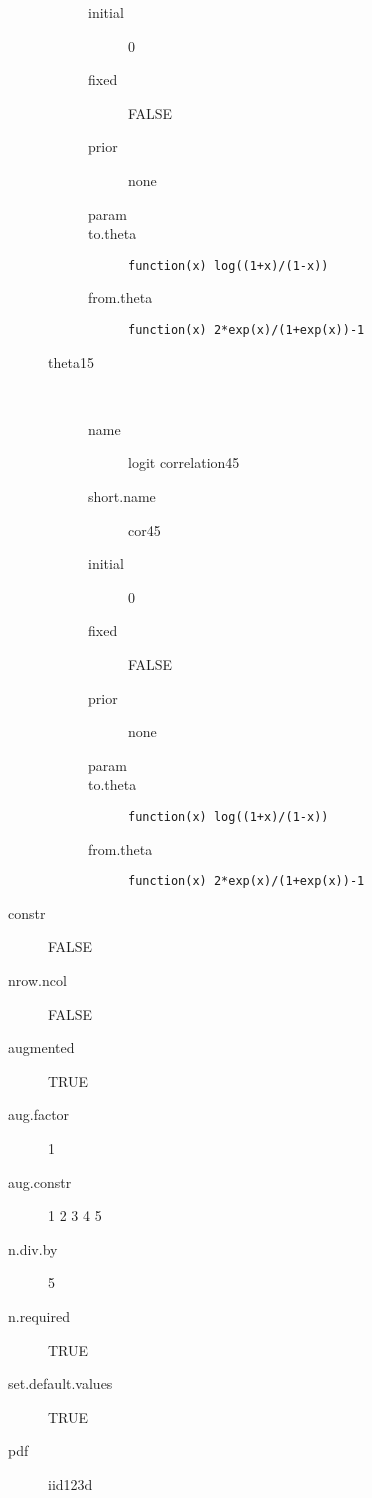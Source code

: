 \begin{description}
\begin{description}
\begin{description}
	 	 	\item[initial] 0
	 	 	\item[fixed] FALSE
	 	 	\item[prior] none
	 	 	\item[param] 
	 	 	\item[to.theta] \verb|function(x) log((1+x)/(1-x))|
	 	 	\item[from.theta] \verb|function(x) 2*exp(x)/(1+exp(x))-1|
	 	 \end{description}
	 	\item[theta15]\ 
	 	 \begin{description}
	 	 	\item[name] logit correlation45
	 	 	\item[short.name] cor45
	 	 	\item[initial] 0
	 	 	\item[fixed] FALSE
	 	 	\item[prior] none
	 	 	\item[param] 
	 	 	\item[to.theta] \verb|function(x) log((1+x)/(1-x))|
	 	 	\item[from.theta] \verb|function(x) 2*exp(x)/(1+exp(x))-1|
	 	 \end{description}
	 \end{description}
	\item[constr] FALSE
	\item[nrow.ncol] FALSE
	\item[augmented] TRUE
	\item[aug.factor] 1
	\item[aug.constr] 1 2 3 4 5
	\item[n.div.by] 5
	\item[n.required] TRUE
	\item[set.default.values] TRUE
	\item[pdf] iid123d
\end{description}
